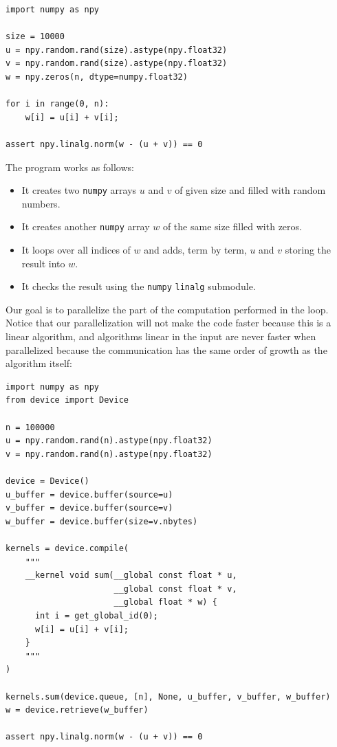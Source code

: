 \documentclass[justified, sixbynine]{tufte-book}
\def\ft{\small\tt}
\theoremstyle{plain}%
\newtheorem * {corollary}{Corollary}
\theoremstyle{definition}
\theoremstyle{remark}
\newtheorem * {remark}{Remark}
\newtheorem * {note}{Note}
\begin{document}
\begin{fullwidth}
\begin{lstlisting}
import numpy as npy

size = 10000
u = npy.random.rand(size).astype(npy.float32)
v = npy.random.rand(size).astype(npy.float32)
w = npy.zeros(n, dtype=numpy.float32)

for i in range(0, n):
    w[i] = u[i] + v[i];

assert npy.linalg.norm(w - (u + v)) == 0
\end{lstlisting}

The program works as follows:
\begin{itemize}
\item It creates two {\ft numpy} arrays $u$ and $v$ of given size and filled with random numbers.
\item It creates another {\ft numpy} array $w$ of the same size filled with zeros.
\item It loops over all indices of $w$ and adds, term by term, $u$ and $v$ storing the result into $w$.
\item It checks the result using the {\ft numpy} {\ft linalg} submodule.
\end{itemize}

Our goal is to parallelize the part of the computation performed in the loop. Notice that our parallelization will not make the code faster because this is a linear algorithm, and algorithms linear in the input are never faster when parallelized because the communication has the same order of growth as the algorithm itself:

\begin{lstlisting}[caption={in file: {\ft opencl\_example1.py}}]
import numpy as npy
from device import Device

n = 100000
u = npy.random.rand(n).astype(npy.float32)
v = npy.random.rand(n).astype(npy.float32)

device = Device()
u_buffer = device.buffer(source=u)
v_buffer = device.buffer(source=v)
w_buffer = device.buffer(size=v.nbytes)

kernels = device.compile(
    """
    __kernel void sum(__global const float * u,
                      __global const float * v,
                      __global float * w) {
      int i = get_global_id(0);
      w[i] = u[i] + v[i];
    }
    """
)

kernels.sum(device.queue, [n], None, u_buffer, v_buffer, w_buffer)
w = device.retrieve(w_buffer)

assert npy.linalg.norm(w - (u + v)) == 0
\end{lstlisting}


\end{fullwidth}
\end{document}
